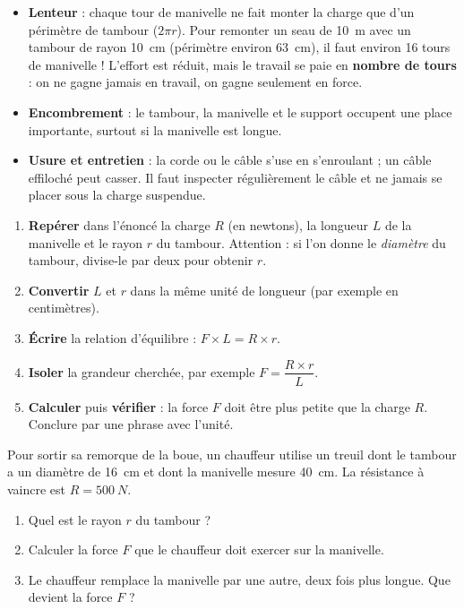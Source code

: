 \documentclass[11pt]{article}
\begin{document}
\begin{attention}
\begin{itemize}
\item \textbf{Lenteur} : chaque tour de manivelle ne fait monter la charge que d'un périmètre de tambour ($2\pi r$). Pour remonter un seau de \SI{10}{m} avec un tambour de rayon \SI{10}{cm} (périmètre environ \SI{63}{cm}), il faut environ 16 tours de manivelle ! L'effort est réduit, mais le travail se paie en \textbf{nombre de tours} : on ne gagne jamais en travail, on gagne seulement en force.
\item \textbf{Encombrement} : le tambour, la manivelle et le support occupent une place importante, surtout si la manivelle est longue.
\item \textbf{Usure et entretien} : la corde ou le câble s'use en s'enroulant ; un câble effiloché peut casser. Il faut inspecter régulièrement le câble et ne jamais se placer sous la charge suspendue.
\end{itemize}
\end{attention}

\begin{methode}
\begin{enumerate}
\item \textbf{Repérer} dans l'énoncé la charge $R$ (en newtons), la longueur $L$ de la manivelle et le rayon $r$ du tambour. Attention : si l'on donne le \emph{diamètre} du tambour, divise-le par deux pour obtenir $r$.
\item \textbf{Convertir} $L$ et $r$ dans la même unité de longueur (par exemple en centimètres).
\item \textbf{Écrire} la relation d'équilibre : $F \times L = R \times r$.
\item \textbf{Isoler} la grandeur cherchée, par exemple $F = \dfrac{R \times r}{L}$.
\item \textbf{Calculer} puis \textbf{vérifier} : la force $F$ doit être plus petite que la charge $R$. Conclure par une phrase avec l'unité.
\end{enumerate}
\end{methode}

\begin{exercice}
Pour sortir sa remorque de la boue, un chauffeur utilise un treuil dont le tambour a un diamètre de \SI{16}{cm} et dont la manivelle mesure \SI{40}{cm}. La résistance à vaincre est $R = \SI{500}{N}$.
\begin{enumerate}
\item Quel est le rayon $r$ du tambour ?
\item Calculer la force $F$ que le chauffeur doit exercer sur la manivelle.
\item Le chauffeur remplace la manivelle par une autre, deux fois plus longue. Que devient la force $F$ ?
\end{enumerate}
\end{exercice}
\end{document}
